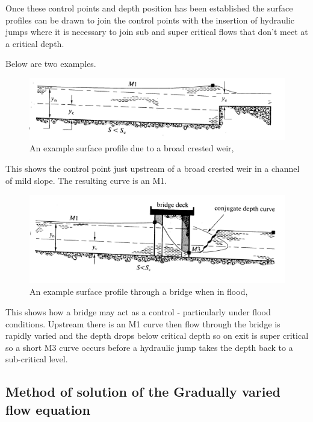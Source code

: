 \documentclass[a4paper, 12pt, british]{article} %
\numberwithin{equation}{section}
\numberwithin{figure}{section}
\numberwithin{table}{section}
\begin{document}
Once these control points and depth position has been established the surface profiles can be drawn to join the control points with the insertion of hydraulic jumps where it is necessary to join sub and super critical flows that don't meet at a critical depth.

Below are two examples.
    \begin{figure}[H]
	\centering
	\includegraphics[scale=0.24]{./images/fig_1161.png}
	\caption{An example surface profile due to a broad crested weir, \cite{chadwick}}
	\label{fig:1161}
\end{figure}


This shows the control point just upstream of a broad crested weir in a channel of mild slope. The resulting curve is an M1.

    \begin{figure}[H]
	\centering
	\includegraphics[scale=0.24]{./images/fig_1162.png}
	\caption{An example surface profile through a bridge when in flood, \cite{chadwick}}
	\label{fig:1162}
\end{figure} 


This shows how a bridge may act as a control - particularly under flood conditions. Upstream there is an M1 curve then flow through the bridge is rapidly varied and the depth drops below critical depth so on exit is super critical so a short M3 curve occurs before a hydraulic jump takes the depth back to a sub-critical level.

\newpage
\subsection{Method of solution of the Gradually varied flow equation}
\end{document}
